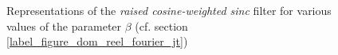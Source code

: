 	
	\label{label_figure_dom_reel_fourier_jt}
	\begin{figure}
		\centering
		\caption{Representations of the \emph{raised cosine-weighted sinc} filter for various values of the parameter $\beta$ (cf. section \ref{label_figure_dom_reel_fourier_jt})}
		\label{szeliski_plotRaisedCosine}
	\end{figure}
	

